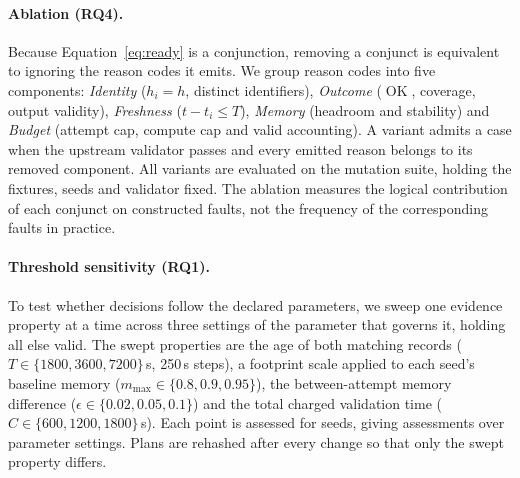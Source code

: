 \begin{table}[t]
\caption{Fault operators of the mutation study. Each operator corrupts one property of an otherwise valid plan and evidence pair. Component is the ablation group that owns the violated term (Graph faults are caught by the upstream validator). First blocker is the weakest policy, in the order static, smoke proxy, \tool{}, that blocks all \LocalSeeds{} variants; each stronger policy blocks them too, and direct admission blocks none.}\label{tab:operators}
\footnotesize\setlength{\tabcolsep}{3pt}
\end{table}

\paragraph{Ablation (RQ4).} Because Equation~\eqref{eq:ready} is a conjunction, removing a conjunct is equivalent to ignoring the reason codes it emits. We group reason codes into five components: \emph{Identity} ($h_i=h$, distinct identifiers), \emph{Outcome} ($\operatorname{OK}$, coverage, output validity), \emph{Freshness} ($t-t_i\leq T$), \emph{Memory} (headroom and stability) and \emph{Budget} (attempt cap, compute cap and valid accounting). A variant admits a case when the upstream validator passes and every emitted reason belongs to its removed component. All \AblationVariants{} variants are evaluated on the mutation suite, holding the fixtures, seeds and validator fixed. The ablation measures the logical contribution of each conjunct on constructed faults, not the frequency of the corresponding faults in practice.

\paragraph{Threshold sensitivity (RQ1).} To test whether decisions follow the declared parameters, we sweep one evidence property at a time across three settings of the parameter that governs it, holding all else valid. The swept properties are the age of both matching records ($T\in\{1800,3600,7200\}$\,s, 250\,s steps), a footprint scale applied to each seed's baseline memory ($m_{\max}\in\{0.8,0.9,0.95\}$), the between-attempt memory difference ($\epsilon\in\{0.02,0.05,0.1\}$) and the total charged validation time ($C\in\{600,1200,1800\}$\,s). Each point is assessed for \LocalSeeds{} seeds, giving \SensitivityAssessments{} assessments over \SensitivitySettings{} parameter settings. Plans are rehashed after every change so that only the swept property differs.

